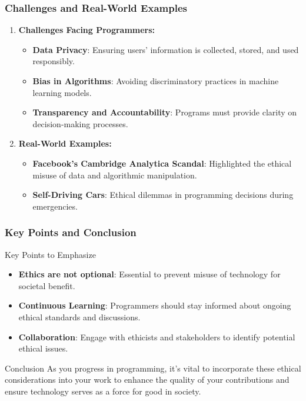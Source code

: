 \documentclass{beamer}
\begin{document}
\begin{frame}[fragile]
    \frametitle{Challenges and Real-World Examples}
    \begin{enumerate}
        \item \textbf{Challenges Facing Programmers:}
            \begin{itemize}
                \item \textbf{Data Privacy}: Ensuring users' information is collected, stored, and used responsibly.
                \item \textbf{Bias in Algorithms}: Avoiding discriminatory practices in machine learning models.
                \item \textbf{Transparency and Accountability}: Programs must provide clarity on decision-making processes.
            \end{itemize}

        \item \textbf{Real-World Examples:}
            \begin{itemize}
                \item \textbf{Facebook's Cambridge Analytica Scandal}: Highlighted the ethical misuse of data and algorithmic manipulation.
                \item \textbf{Self-Driving Cars}: Ethical dilemmas in programming decisions during emergencies.
            \end{itemize}
    \end{enumerate}
\end{frame}

\begin{frame}[fragile]
    \frametitle{Key Points and Conclusion}
    \begin{block}{Key Points to Emphasize}
        \begin{itemize}
            \item \textbf{Ethics are not optional}: Essential to prevent misuse of technology for societal benefit.
            \item \textbf{Continuous Learning}: Programmers should stay informed about ongoing ethical standards and discussions.
            \item \textbf{Collaboration}: Engage with ethicists and stakeholders to identify potential ethical issues.
        \end{itemize}
    \end{block}

    \begin{block}{Conclusion}
        As you progress in programming, it’s vital to incorporate these ethical considerations into your work to enhance the quality of your contributions and ensure technology serves as a force for good in society.
    \end{block}
\end{frame}
\end{document}
